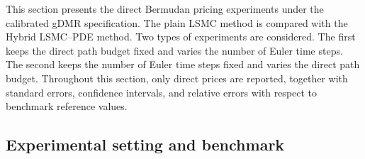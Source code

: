 \documentclass[pdflatex,sn-mathphys-num]{sn-jnl}
\theoremstyle{thmstyleone}%
\theoremstyle{thmstylethree}%
\theoremstyle{thmstyletwo}%
\begin{document}
This section presents the direct Bermudan pricing experiments under the calibrated gDMR specification. The plain LSMC method \cite{longstaff2001valuing} is compared with the Hybrid LSMC--PDE method. Two types of experiments are considered. The first keeps the direct path budget fixed and varies the number of Euler time steps. The second keeps the number of Euler time steps fixed and varies the direct path budget. Throughout this section, only direct prices are reported, together with standard errors, confidence intervals, and relative errors with respect to benchmark reference values.

\subsection{Experimental setting and benchmark}
\end{document}
